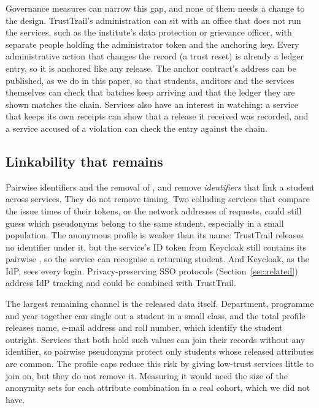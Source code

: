 Governance measures can narrow this gap, and none of them needs a change to the design. TrustTrail's administration can sit with an office that does not run the services, such as the institute's data protection or grievance officer, with separate people holding the administrator token and the anchoring key. Every administrative action that changes the record (a trust reset) is already a ledger entry, so it is anchored like any release. The anchor contract's address can be published, as we do in this paper, so that students, auditors and the services themselves can check that batches keep arriving and that the ledger they are shown matches the chain. Services also have an interest in watching: a service that keeps its own receipts can show that a release it received was recorded, and a service accused of a violation can check the entry against the chain.

\subsection{Linkability that remains}
Pairwise identifiers and the removal of ,  and  remove \emph{identifiers} that link a student across services. They do not remove timing. Two colluding services that compare the issue times of their tokens, or the network addresses of requests, could still guess which pseudonyms belong to the same student, especially in a small population. The anonymous profile is weaker than its name: TrustTrail releases no identifier under it, but the service's ID token from Keycloak still contains its pairwise , so the service can recognise a returning student. And Keycloak, as the IdP, sees every login. Privacy-preserving SSO protocols (Section~\ref{sec:related}) address IdP tracking and could be combined with TrustTrail.

The largest remaining channel is the released data itself. Department, programme and year together can single out a student in a small class, and the total profile releases name, e-mail address and roll number, which identify the student outright. Services that both hold such values can join their records without any identifier, so pairwise pseudonyms protect only students whose released attributes are common. The profile caps reduce this risk by giving low-trust services little to join on, but they do not remove it. Measuring it would need the size of the anonymity sets for each attribute combination in a real cohort, which we did not have.

